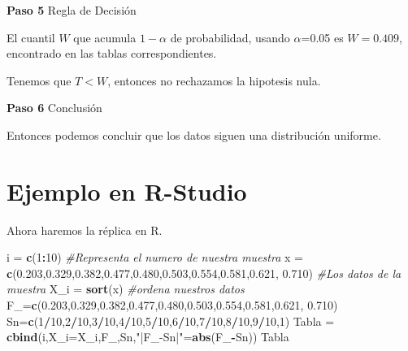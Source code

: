 \documentclass[
  a4paper,
  oneside,
  openany]{book}
\newenvironment{Shaded}{\begin{snugshade}}{\end{snugshade}}
\newcommand{\CommentTok}[1]{\textcolor[rgb]{0.56,0.35,0.01}{\textit{#1}}}
\newcommand{\DataTypeTok}[1]{\textcolor[rgb]{0.13,0.29,0.53}{#1}}
\newcommand{\DecValTok}[1]{\textcolor[rgb]{0.00,0.00,0.81}{#1}}
\newcommand{\FloatTok}[1]{\textcolor[rgb]{0.00,0.00,0.81}{#1}}
\newcommand{\KeywordTok}[1]{\textcolor[rgb]{0.13,0.29,0.53}{\textbf{#1}}}
\newcommand{\NormalTok}[1]{#1}
\newcommand{\OperatorTok}[1]{\textcolor[rgb]{0.81,0.36,0.00}{\textbf{#1}}}
\newcommand{\StringTok}[1]{\textcolor[rgb]{0.31,0.60,0.02}{#1}}
\begin{document}
\textbf{Paso 5} Regla de Decisión

El cuantil \(W\) que acumula \(1-\alpha\) de probabilidad, usando \(\alpha\)=0.05 es \(W=0.409\), encontrado en las tablas correspondientes.

Tenemos que \(T<W\), entonces no rechazamos la hipotesis nula.

\textbf{Paso 6} Conclusión

Entonces podemos concluir que los datos siguen una distribución uniforme.

\hypertarget{ejemplo-en-r-studio-14}{%
\section{Ejemplo en R-Studio}\label{ejemplo-en-r-studio-14}}

Ahora haremos la réplica en R.

\begin{Shaded}
\begin{Highlighting}[]
\NormalTok{i =}\StringTok{ }\KeywordTok{c}\NormalTok{(}\DecValTok{1}\OperatorTok{:}\DecValTok{10}\NormalTok{) }\CommentTok{\#Representa el numero de nuestra muestra}
\NormalTok{x =}\StringTok{ }\KeywordTok{c}\NormalTok{(}\FloatTok{0.203}\NormalTok{,}\FloatTok{0.329}\NormalTok{,}\FloatTok{0.382}\NormalTok{,}\FloatTok{0.477}\NormalTok{,}\FloatTok{0.480}\NormalTok{,}\FloatTok{0.503}\NormalTok{,}\FloatTok{0.554}\NormalTok{,}\FloatTok{0.581}\NormalTok{,}\FloatTok{0.621}\NormalTok{, }\FloatTok{0.710}\NormalTok{) }\CommentTok{\#Los datos de la muestra}
\NormalTok{X\_i =}\StringTok{ }\KeywordTok{sort}\NormalTok{(x) }\CommentTok{\#ordena nuestros datos}
\NormalTok{F\_=}\KeywordTok{c}\NormalTok{(}\FloatTok{0.203}\NormalTok{,}\FloatTok{0.329}\NormalTok{,}\FloatTok{0.382}\NormalTok{,}\FloatTok{0.477}\NormalTok{,}\FloatTok{0.480}\NormalTok{,}\FloatTok{0.503}\NormalTok{,}\FloatTok{0.554}\NormalTok{,}\FloatTok{0.581}\NormalTok{,}\FloatTok{0.621}\NormalTok{, }\FloatTok{0.710}\NormalTok{)}
\NormalTok{Sn=}\KeywordTok{c}\NormalTok{(}\DecValTok{1}\OperatorTok{/}\DecValTok{10}\NormalTok{,}\DecValTok{2}\OperatorTok{/}\DecValTok{10}\NormalTok{,}\DecValTok{3}\OperatorTok{/}\DecValTok{10}\NormalTok{,}\DecValTok{4}\OperatorTok{/}\DecValTok{10}\NormalTok{,}\DecValTok{5}\OperatorTok{/}\DecValTok{10}\NormalTok{,}\DecValTok{6}\OperatorTok{/}\DecValTok{10}\NormalTok{,}\DecValTok{7}\OperatorTok{/}\DecValTok{10}\NormalTok{,}\DecValTok{8}\OperatorTok{/}\DecValTok{10}\NormalTok{,}\DecValTok{9}\OperatorTok{/}\DecValTok{10}\NormalTok{,}\DecValTok{1}\NormalTok{)}
\NormalTok{Tabla =}\StringTok{ }\KeywordTok{cbind}\NormalTok{(i,}\DataTypeTok{X\_i=}\NormalTok{X\_i,F\_,Sn,}\StringTok{"|F\_{-}Sn|"}\NormalTok{=}\KeywordTok{abs}\NormalTok{(F\_}\OperatorTok{{-}}\NormalTok{Sn))}
\NormalTok{Tabla}
\end{Highlighting}
\end{Shaded}
\end{document}
